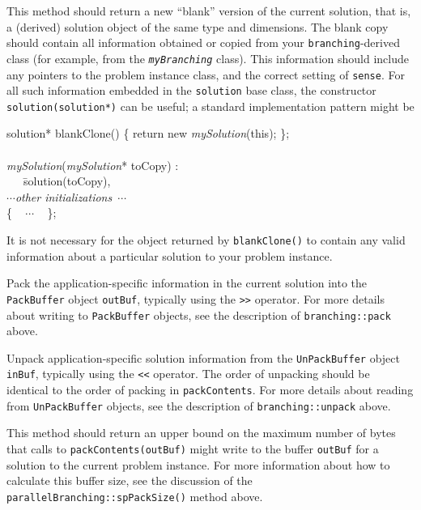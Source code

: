  This method should return 
a new ``blank'' version of the
current solution, that is, a (derived) solution object 
of the same type and dimensions.  
The blank copy should contain all information obtained or
copied from your \texttt{branching}-derived class (for example, from
the \texttt{\emph{myBranching}} class).  This information should
include any pointers to the problem instance class, and the correct
setting of \texttt{sense}.  For all such information embedded in the
\texttt{solution} base class, the constructor
\texttt{solution(solution*)} can be useful; a standard implementation
pattern might be
\begin{codeblock}
solution* blankClone() \{ return new \emph{mySolution}(this); \}; \\
\\
\emph{mySolution}(\emph{mySolution}* toCopy) : \\
~~~\=solution(toCopy), \\
\> $\cdots$\textrm{\emph{other initializations}}~$\cdots$ \\
\{ ~ $\cdots$ ~ \};
\end{codeblock}
It is not necessary for the object returned by \texttt{blankClone()}
to contain any valid information about a particular solution to your
problem instance.

 Pack the
application-specific information in the current solution into the
\texttt{PackBuffer} object \texttt{outBuf}, typically using the
\texttt{>>} operator.  For more details about writing to
\texttt{PackBuffer} objects, see the description of
\texttt{branching::pack} above.

Unpack application-specific solution information from the
\texttt{UnPackBuffer} object \texttt{inBuf}, typically using the
\texttt{<<} operator.  The order of unpacking should be identical to
the order of packing in \texttt{packContents}.    For
more details about reading from \texttt{UnPackBuffer} objects, see the
description of \texttt{branching::unpack} above.

 This method should return an upper
bound on the maximum number of bytes
that calls to \texttt{packContents(outBuf)} might write to the buffer
\texttt{outBuf} for a solution to the current problem instance.  For more
information about how to calculate this buffer size, see the
discussion of the \texttt{parallelBranching::spPackSize()} method
above. 

